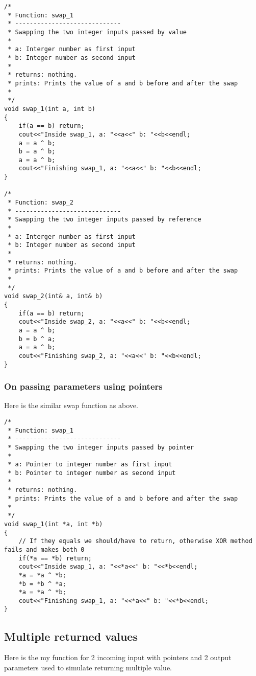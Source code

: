 \documentclass{article}
\begin{document}
		
		\begin{lstlisting}[label=swap-by-value,caption=Swap Function by value and reference]	
/*
 * Function: swap_1
 * -----------------------------
 * Swapping the two integer inputs passed by value
 *
 * a: Interger number as first input
 * b: Integer number as second input
 *
 * returns: nothing.
 * prints: Prints the value of a and b before and after the swap
 *
 */
void swap_1(int a, int b)
{
    if(a == b) return;
    cout<<"Inside swap_1, a: "<<a<<" b: "<<b<<endl;
    a = a ^ b;
    b = a ^ b;
    a = a ^ b;
    cout<<"Finishing swap_1, a: "<<a<<" b: "<<b<<endl;
}

/*
 * Function: swap_2
 * -----------------------------
 * Swapping the two integer inputs passed by reference
 *
 * a: Interger number as first input
 * b: Integer number as second input
 *
 * returns: nothing.
 * prints: Prints the value of a and b before and after the swap
 *
 */
void swap_2(int& a, int& b)
{
    if(a == b) return;
    cout<<"Inside swap_2, a: "<<a<<" b: "<<b<<endl;
    a = a ^ b;
    b = b ^ a;
    a = a ^ b;
    cout<<"Finishing swap_2, a: "<<a<<" b: "<<b<<endl;
}
		\end{lstlisting}


		\subsubsection{On passing parameters using pointers}
		Here is the similar swap function as above.
		
		\begin{lstlisting}[label=swap-with-pointer,caption=Swap Function using pointers]	
/*
 * Function: swap_1
 * -----------------------------
 * Swapping the two integer inputs passed by pointer
 *
 * a: Pointer to integer number as first input
 * b: Pointer to integer number as second input
 *
 * returns: nothing.
 * prints: Prints the value of a and b before and after the swap
 *
 */
void swap_1(int *a, int *b)
{
    // If they equals we should/have to return, otherwise XOR method fails and makes both 0
    if(*a == *b) return;
    cout<<"Inside swap_1, a: "<<*a<<" b: "<<*b<<endl;
    *a = *a ^ *b;
    *b = *b ^ *a;
    *a = *a ^ *b;
    cout<<"Finishing swap_1, a: "<<*a<<" b: "<<*b<<endl;
}
		\end{lstlisting}

	\subsection{Multiple returned values}		
	Here is the my function for 2 incoming input with pointers and 2 output parameters used to simulate returning multiple value.
	
\end{document}
